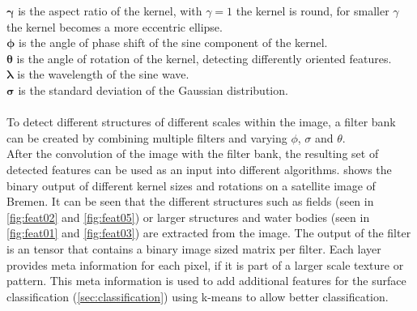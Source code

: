 \documentclass[12pt,a4paper, english,twoside]{scrartcl}
\begin{document}
      $\boldsymbol{\gamma}$ is the aspect ratio of the kernel, with $\gamma = 1$ the kernel is round, for smaller $\gamma$ the kernel becomes a more eccentric ellipse.\\
        $\boldsymbol{\phi}$ is the angle of phase shift of the sine component of the kernel. \\
        $\boldsymbol{\theta}$ is the angle of rotation of the kernel, detecting differently oriented features.\\
        $\boldsymbol{\lambda}$ is the wavelength of the sine wave. \\
        $\boldsymbol{\sigma}$ is the standard deviation of the Gaussian distribution.\\ \\
      \noindent
      To detect different structures of different scales within the image, a filter bank can be created by combining multiple filters and varying $\phi$, $\sigma$ and $\theta$.\\
      After the convolution of the image with the filter bank, the resulting set of detected features can be used as an input into different algorithms.
       shows the binary output of different kernel sizes and rotations on a satellite image of Bremen. 
      It can be seen that the different structures such as fields (seen in \cref{fig:feat02} and \cref{fig:feat05}) or larger structures and water bodies (seen in \cref{fig:feat01} and \cref{fig:feat03}) are extracted from the image.
      The output of the filter is an tensor that contains a binary image sized matrix per filter. 
      Each layer provides meta information for each pixel, if it is part of a larger scale texture or pattern. 
      This meta information is used to add additional features for the surface classification (\cref{sec:classification}) using k-means %
      to allow better classification.%
\end{document}
